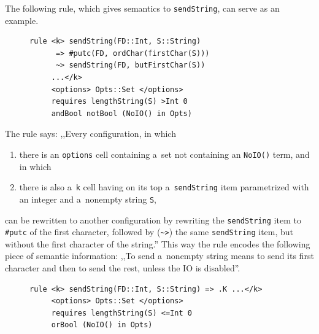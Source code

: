 \documentclass{fithesis3}
\begin{document}
The following rule, which gives semantics to \texttt{sendString}, can serve as an example.
\begin{figure}[h]
\begin{lstlisting}
rule <k> sendString(FD::Int, S::String)
      => #putc(FD, ordChar(firstChar(S)))
      ~> sendString(FD, butFirstChar(S))
     ...</k>
     <options> Opts::Set </options>
     requires lengthString(S) >Int 0
     andBool notBool (NoIO() in Opts)
\end{lstlisting}
\end{figure}

The rule says: ,,Every configuration, in which
\begin{enumerate}
\item there is an \texttt{options} cell containing a~set not containing an \texttt{NoIO()} term, and in which
\item there is also a~\texttt{k} cell having on its top a~\texttt{sendString} item parametrized with an integer and a~nonempty string \texttt{S},
\end{enumerate}
can be rewritten to another configuration by rewriting the \texttt{sendString} item to \texttt{\#putc} of the first character, followed by (\lstinline{~>}) the same \texttt{sendString} item, but without the first character of the string.''
This way the rule encodes the following piece of semantic information: ,,To send a~nonempty string means to send its first character and then to send the rest, unless the IO is disabled''.


%
%
%


\begin{figure}
\begin{lstlisting}
rule <k> sendString(FD::Int, S::String) => .K ...</k>
     <options> Opts::Set </options>
     requires lengthString(S) <=Int 0
     orBool (NoIO() in Opts)
\end{lstlisting}
\end{figure}
\end{document}
